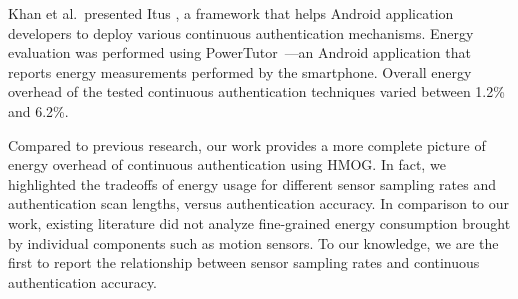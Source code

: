 Khan et al.~presented Itus \cite{Khan:2014:IIA:2639108.2639141}, a framework that helps Android application developers to deploy various continuous authentication mechanisms. Energy evaluation was performed using PowerTutor~\cite{PowerTutor}---an Android application that reports energy measurements performed by the smartphone. Overall energy overhead of the tested continuous authentication techniques varied between 1.2\% and 6.2\%. 

 Compared to previous research, our work provides a more complete picture of 
energy overhead of continuous authentication using HMOG. In fact, we highlighted 
the tradeoffs of energy usage for different sensor sampling rates and 
authentication scan lengths, versus authentication accuracy. In comparison to our work, existing literature did not analyze fine-grained energy consumption brought by individual components such as motion sensors. 
To our knowledge, we are the first to report 
the relationship between sensor sampling rates and continuous 
authentication accuracy.

%
%
